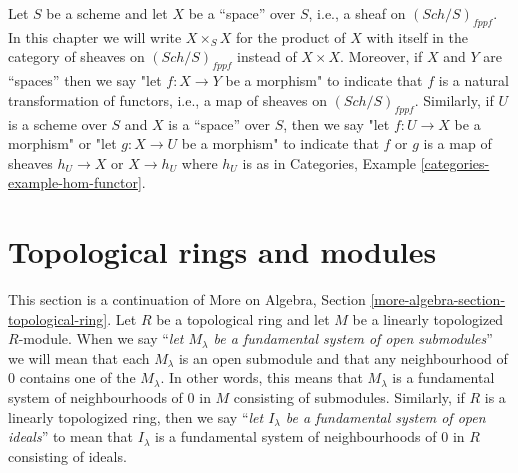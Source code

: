 \documentclass{stacks-project}
\theoremstyle{plain}
\theoremstyle{definition}
\theoremstyle{remark}
\numberwithin{equation}{subsection}
\def\Sch{\mathit{Sch}}
\begin{document}
\medskip\noindent
Let $S$ be a scheme and let $X$ be a ``space'' over $S$, i.e., a sheaf on
$(\Sch/S)_{fppf}$. In this chapter we will write $X \times_S X$ for the
product of $X$ with itself in the category of sheaves on $(\Sch/S)_{fppf}$
instead of $X \times X$. Moreover, if $X$ and $Y$ are ``spaces'' then
we say "let $f : X \to Y$ be a morphism" to indicate that $f$ is a
natural transformation of functors, i.e., a map of sheaves on
$(\Sch/S)_{fppf}$. Similarly, if $U$ is a scheme over $S$ and
$X$ is a ``space'' over $S$, then we say
"let $f : U \to X$ be a morphism" or
"let $g : X \to U$ be a morphism" to indicate that $f$ or $g$
is a map of sheaves $h_U \to X$ or $X \to h_U$ where $h_U$ is as in
Categories, Example \ref{categories-example-hom-functor}.






\section{Topological rings and modules}
\label{section-topological-module}

\noindent
This section is a continuation of
More on Algebra, Section \ref{more-algebra-section-topological-ring}.
Let $R$ be a topological ring and let $M$ be a linearly topologized
$R$-module. When we say ``{\it let $M_\lambda$ be a fundamental system of
open submodules}'' we will mean that each $M_\lambda$ is an open submodule
and that any neighbourhood of $0$ contains one of the $M_\lambda$.
In other words, this means that $M_\lambda$ is a fundamental system
of neighbourhoods of $0$ in $M$ consisting of submodules.
Similarly, if $R$ is a linearly topologized ring, then we say
``{\it let $I_\lambda$ be a fundamental system of open ideals}''
to mean that $I_\lambda$ is a fundamental system
of neighbourhoods of $0$ in $R$ consisting of ideals.
\end{document}
